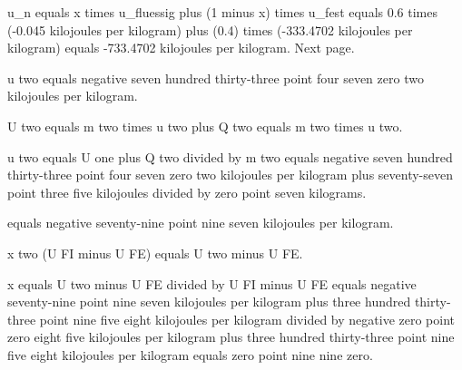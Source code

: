 u_n equals x times u_fluessig plus (1 minus x) times u_fest equals 0.6 times (-0.045 kilojoules per kilogram) plus (0.4) times (-333.4702 kilojoules per kilogram) equals -733.4702 kilojoules per kilogram. Next page.

u two equals negative seven hundred thirty-three point four seven zero two kilojoules per kilogram.

U two equals m two times u two plus Q two equals m two times u two.

u two equals U one plus Q two divided by m two equals negative seven hundred thirty-three point four seven zero two kilojoules per kilogram plus seventy-seven point three five kilojoules divided by zero point seven kilograms.

equals negative seventy-nine point nine seven kilojoules per kilogram.

x two (U FI minus U FE) equals U two minus U FE.

x equals U two minus U FE divided by U FI minus U FE equals negative seventy-nine point nine seven kilojoules per kilogram plus three hundred thirty-three point nine five eight kilojoules per kilogram divided by negative zero point zero eight five kilojoules per kilogram plus three hundred thirty-three point nine five eight kilojoules per kilogram equals zero point nine nine zero.